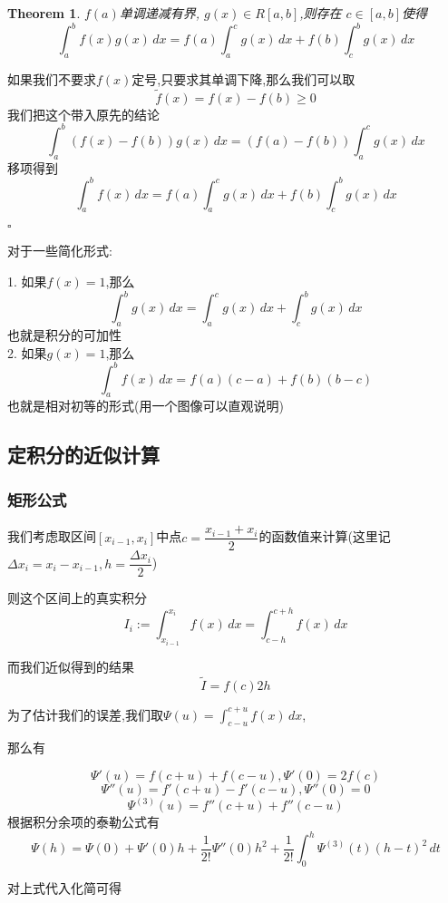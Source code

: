 \documentclass[11pt,hyperref,a4paper,UTF8]{ctexart}
\newtheorem{theorem}{Theorem}[subsection]
\newenvironment{cproof}{%
\heiti{证明}\kaishu
}{%
  \hfill $\square$
  \par\bigskip
}
\begin{document}
\begin{CJK}{UTF8}{gkai}
\begin{theorem}
  $f(a)$单调递减有界, $g(x) \in R[a,b]$,则存在 $c \in [a,b]$使得
  \[\int_{a}^{b} f(x)g(x)\, dx = f(a) \int_{a}^{c} g(x)\, dx+ f(b) \int_{c}^{b}g(x)\, dx\]
\end{theorem}

\begin{cproof}
  
  如果我们不要求$f(x)$定号,只要求其单调下降,那么我们可以取
  \[\tilde{f}(x) = f(x) - f(b) \geq 0\]
  我们把这个带入原先的结论
  \[\int_{a}^{b} (f(x) - f(b))g(x) \, dx = (f(a) - f(b)) \int_{a}^{c}g(x)\, dx\]
  移项得到
  \[\int_{a}^{b} f(x)\, dx = f(a)\int_{a}^{c}g(x)\, dx + f(b) \int_{c}^{b}g(x)\, dx \]
  
\end{cproof}

对于一些简化形式:

1. 如果$f(x) = 1$,那么 
\[\int_{a}^{b}g(x)\, dx = \int_{a}^{c}g(x)\, dx + \int_{c}^{b}g(x)\, dx\]
也就是积分的可加性\\

2. 如果$g(x) = 1$,那么
\[\int_{a}^{b}f(x)\, dx = f(a) (c -a) + f(b) (b - c)\]
也就是相对初等的形式(用一个图像可以直观说明)

\subsection{定积分的近似计算}

\subsubsection{矩形公式}

我们考虑取区间$[x_{i-1},x_i]$中点$c = \dfrac{x_{i - 1} + x_i}{2}$的函数值来计算(这里记$\Delta x_i = x_i - x_{i -1},h = \dfrac{\Delta x_i}{2}$)

则这个区间上的真实积分
\[I_i := \int_{x_{i-1
}}^{x_i} f(x)\,dx = \int_{c - h}^{c +h}f(x)\,dx\]

而我们近似得到的结果
\[\tilde{I} = f(c) 2h\]

为了估计我们的误差,我们取$\varPsi(u) = \int_{c-u}^{c+u}f(x)\,dx$,

那么有

\[\varPsi'(u) = f(c + u) + f(c-u),\varPsi'(0) = 2f(c)\]
\[\varPsi''(u) = f'(c+u) - f'(c - u),\varPsi''(0) = 0\]
\[\varPsi^{(3)}(u) = f''(c+u) + f''(c - u)\]
根据积分余项的泰勒公式有
\[\varPsi(h) = \varPsi(0) + \varPsi'(0)h + \dfrac{1}{2!}\varPsi''(0)h^2 + \dfrac{1}{2!} \int_{0}^{h}\varPsi^{(3)}(t)(h-t)^2\,dt\]

对上式代入化简可得


\end{CJK}
\end{document}
